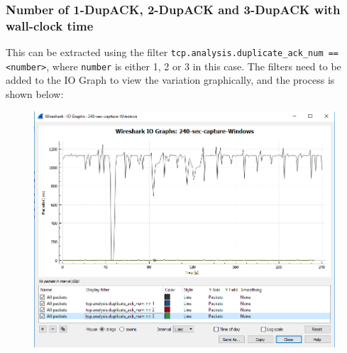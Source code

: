 \documentclass{article}
\begin{document}
\subsubsection{Number of 1-DupACK, 2-DupACK and 3-DupACK with wall-clock time}
\begin{flushleft}
This can be extracted using the filter \texttt{tcp.analysis.duplicate\_ack\_num == <number>}, where \texttt{number} is either 1, 2 or 3 in this case. The filters need to be added to the IO Graph to view the variation graphically, and the process is shown below:
\begin{figure}[H]
\centering
\includegraphics[width=0.55\linewidth]{dup-ack-capture-process.png}
\end{figure}


\end{flushleft}
\end{document}
